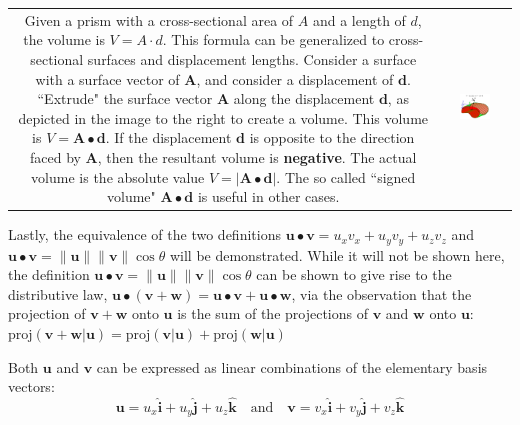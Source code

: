 \documentclass{article}
\begin{document}
\begin{tabular}{cc}
\parbox{0.5\textwidth}{Given a prism with a cross-sectional area of \(A\) and a length of \(d\), the volume is \(V = A \cdot d\). This formula can be generalized to cross-sectional surfaces and displacement lengths. Consider a surface with a surface vector of \(\mathbf{A}\), and consider a displacement of \(\mathbf{d}\). ``Extrude" the surface vector \(\mathbf{A}\) along the displacement \(\mathbf{d}\), as depicted in the image to the right to create a volume. This volume is \(V = \mathbf{A} \bullet \mathbf{d}\). If the displacement \(\mathbf{d}\) is opposite to the direction faced by \(\mathbf{A}\), then the resultant volume is {\bf negative}. The actual volume is the absolute value \(V = \left|\mathbf{A} \bullet \mathbf{d}\right|\). The so called ``signed volume" \(\mathbf{A} \bullet \mathbf{d}\) is useful in other cases.
} & \parbox{0.5\textwidth}{
\includegraphics[width = 0.5\textwidth]{surface_displacement_product}
}
\end{tabular}


Lastly, the equivalence of the two definitions \(\mathbf{u} \bullet \mathbf{v} = u_x v_x + u_y v_y + u_z v_z\) and \(\mathbf{u} \bullet \mathbf{v} = \|\mathbf{u}\|\|\mathbf{v}\|\cos\theta\) will be demonstrated. While it will not be shown here, the definition \(\mathbf{u} \bullet \mathbf{v} = \|\mathbf{u}\|\|\mathbf{v}\|\cos\theta\) can be shown to give rise to the distributive law, \(\mathbf{u} \bullet (\mathbf{v} + \mathbf{w}) = \mathbf{u} \bullet \mathbf{v} + \mathbf{u} \bullet \mathbf{w}\), via the observation that the projection of \(\mathbf{v} + \mathbf{w}\) onto \(\mathbf{u}\) is the sum of the projections of \(\mathbf{v}\) and \(\mathbf{w}\) onto \(\mathbf{u}\): \(\text{proj}(\mathbf{v} + \mathbf{w} | \mathbf{u}) = \text{proj}(\mathbf{v} | \mathbf{u}) + \text{proj}(\mathbf{w} | \mathbf{u})\)

Both \(\mathbf{u}\) and \(\mathbf{v}\) can be expressed as linear combinations of the elementary basis vectors:
\[\mathbf{u} = u_x \hat{\mathbf{i}} + u_y \hat{\mathbf{j}} + u_z \hat{\mathbf{k}} \quad\text{and}\quad \mathbf{v} = v_x \hat{\mathbf{i}} + v_y \hat{\mathbf{j}} + v_z \hat{\mathbf{k}}\]
\end{document}
